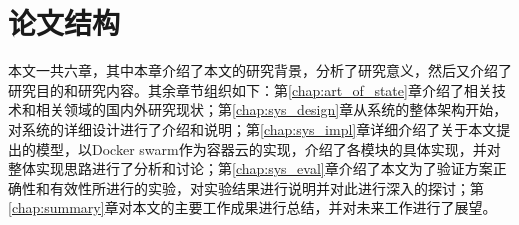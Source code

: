 \section{论文结构}
本文一共六章，其中本章介绍了本文的研究背景，分析了研究意义，然后又介绍了研究目的和研究内容。其余章节组织如下：第\ref{chap:art_of_state}章介绍了相关技术和相关领域的国内外研究现状；第\ref{chap:sys_design}章从系统的整体架构开始，对系统的详细设计进行了介绍和说明；第\ref{chap:sys_impl}章详细介绍了关于本文提出的模型，以Docker swarm作为容器云的实现，介绍了各模块的具体实现，并对整体实现思路进行了分析和讨论；第\ref{chap:sys_eval}章介绍了本文为了验证方案正确性和有效性所进行的实验，对实验结果进行说明并对此进行深入的探讨；第\ref{chap:summary}章对本文的主要工作成果进行总结，并对未来工作进行了展望。